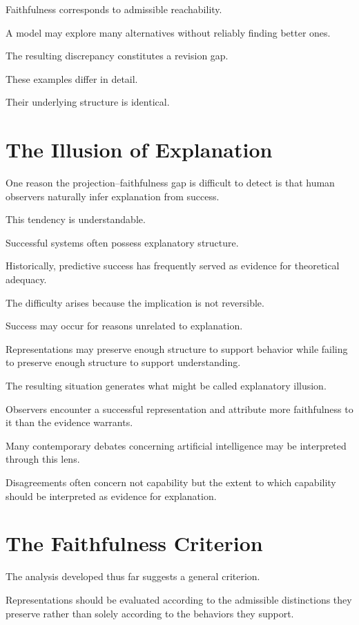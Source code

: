 \documentclass[11pt,oneside,openany]{book}
\begin{document}
Faithfulness corresponds to admissible reachability.

A model may explore many alternatives without reliably finding better ones.

The resulting discrepancy constitutes a revision gap.

These examples differ in detail.

Their underlying structure is identical.

\section{The Illusion of Explanation}

One reason the projection--faithfulness gap is difficult to detect is that human observers naturally infer explanation from success.

This tendency is understandable.

Successful systems often possess explanatory structure.

Historically, predictive success has frequently served as evidence for theoretical adequacy.

The difficulty arises because the implication is not reversible.

Success may occur for reasons unrelated to explanation.

Representations may preserve enough structure to support behavior while failing to preserve enough structure to support understanding.

The resulting situation generates what might be called explanatory illusion.

Observers encounter a successful representation and attribute more faithfulness to it than the evidence warrants.

Many contemporary debates concerning artificial intelligence may be interpreted through this lens.

Disagreements often concern not capability but the extent to which capability should be interpreted as evidence for explanation.

\section{The Faithfulness Criterion}

The analysis developed thus far suggests a general criterion.

Representations should be evaluated according to the admissible distinctions they preserve rather than solely according to the behaviors they support.
\end{document}

